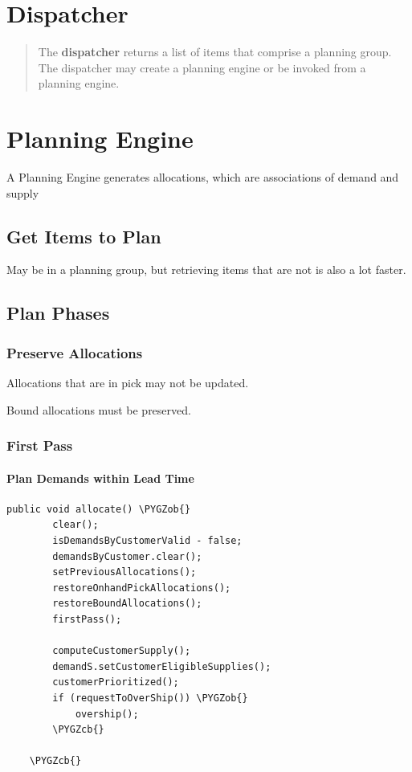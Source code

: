 \documentclass[letterpaper,10pt,english]{sphinxmanual}
\def\PYGZob{\char`\{}
\def\PYGZcb{\char`\}}
\begin{document}
\section{Dispatcher}
\label{APS/ComponentsAndServices:dispatcher}\begin{quote}

The \textbf{dispatcher} returns a list of items that comprise a planning group.  The dispatcher may      create a planning engine or be invoked from a planning engine.
\end{quote}


\section{Planning Engine}
\label{APS/ComponentsAndServices:planning-engine}
A Planning Engine generates allocations, which are associations of
demand and supply


\subsection{Get Items to Plan}
\label{APS/ComponentsAndServices:get-items-to-plan}
May be in a planning group, but retrieving items that are not is also a
lot faster.


\subsection{Plan Phases}
\label{APS/ComponentsAndServices:plan-phases}

\subsubsection{Preserve Allocations}
\label{APS/ComponentsAndServices:preserve-allocations}
Allocations that are in pick may not be updated.

Bound allocations must be preserved.


\subsubsection{First Pass}
\label{APS/ComponentsAndServices:first-pass}

\paragraph{Plan Demands within Lead Time}
\label{APS/ComponentsAndServices:plan-demands-within-lead-time}
\begin{Verbatim}[commandchars=\\\{\}]
public void allocate() \PYGZob{}
        clear();
        isDemandsByCustomerValid - false;
        demandsByCustomer.clear();
        setPreviousAllocations();
        restoreOnhandPickAllocations();
        restoreBoundAllocations();
        firstPass();

        computeCustomerSupply();
        demandS.setCustomerEligibleSupplies();
        customerPrioritized();
        if (requestToOverShip()) \PYGZob{}
            overship();
        \PYGZcb{}

    \PYGZcb{}
\end{Verbatim}
\end{document}

